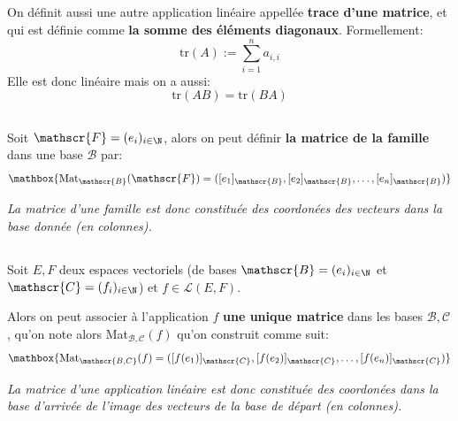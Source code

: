 \subsection*{}

On définit aussi une autre application linéaire appellée \textbf{trace d'une matrice}, et qui est définie comme \textbf{la somme des éléments diagonaux}. Formellement:
\[
   \text{tr}(A) := \sum_{i=1}^{n} a_{i, i}   
\]
Elle est donc linéaire mais on a aussi:
\[
   \text{tr}(AB) = \text{tr}(BA)   
\]

\subsection*{}

Soit \(\mathscr{F} = (e_i)_{i\in\N}\), alors on peut définir \textbf{la matrice de la famille} dans une base \(\mathscr{B}\) par:
\[
   \mathbox{\text{Mat}_{\mathscr{B}}(\mathscr{F}) = ([e_1]_{\mathscr{B}}, [e_2]_{\mathscr{B}}, \ldots, [e_n]_{\mathscr{B}})}
\]

\begin{center}
   \textit{
      La matrice d'une famille est donc constituée des coordonées des vecteurs\+
      dans la base donnée (en colonnes).
   }
\end{center}
\pagebreak

\subsection*{}

Soit \(E, F\) deux espaces vectoriels (de bases \(\mathscr{B} = (e_i)_{i \in \N}\) et \(\mathscr{C}=(f_i)_{i \in \N}\)) et \(f \in \mathcal{L}(E, F)\).\<

Alors on peut associer à l'application \(f\) \textbf{une unique matrice} dans les bases \(\mathscr{B, C}\), qu'on note alors Mat\(_{\mathscr{B, C}}(f)\) qu'on construit comme suit:
\[
   \mathbox{\text{Mat}_{\mathscr{B, C}}(f) = ([f(e_1)]_{\mathscr{C}}, [f(e_2)]_{\mathscr{C}}, \ldots, [f(e_n)]_{\mathscr{C}})}   
\]
\begin{center}
   \textit{
      La matrice d'une application linéaire est donc constituée des coordonées dans la base d'arrivée de l'image des vecteurs de la base de départ (en colonnes).
   }
\end{center}

